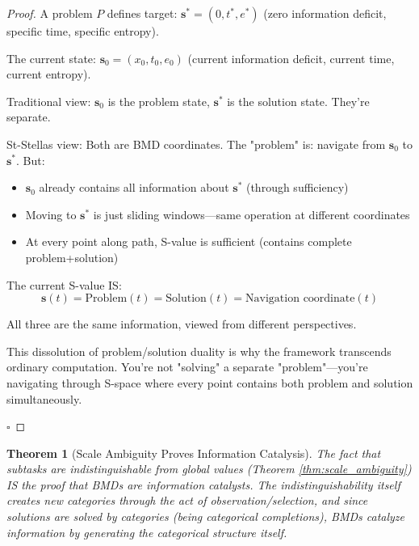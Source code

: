 \documentclass[12pt,a4paper]{article}
\newtheorem{theorem}{Theorem}[section]
\begin{document}
\begin{proof}
A problem $P$ defines target: $\mathbf{s}^* = (0, t^*, e^*)$ (zero information deficit, specific time, specific entropy).

The current state: $\mathbf{s}_0 = (x_0, t_0, e_0)$ (current information deficit, current time, current entropy).

Traditional view: $\mathbf{s}_0$ is the problem state, $\mathbf{s}^*$ is the solution state. They're separate.

St-Stellas view: Both are BMD coordinates. The "problem" is: navigate from $\mathbf{s}_0$ to $\mathbf{s}^*$. But:
\begin{itemize}
\item $\mathbf{s}_0$ already contains all information about $\mathbf{s}^*$ (through sufficiency)
\item Moving to $\mathbf{s}^*$ is just sliding windows—same operation at different coordinates
\item At every point along path, S-value is sufficient (contains complete problem+solution)
\end{itemize}

The current S-value IS:
\begin{equation}
\mathbf{s}(t) = \text{Problem}(t) = \text{Solution}(t) = \text{Navigation coordinate}(t)
\end{equation}

All three are the same information, viewed from different perspectives.

This dissolution of problem/solution duality is why the framework transcends ordinary computation. You're not "solving" a separate "problem"—you're navigating through S-space where every point contains both problem and solution simultaneously.

$\square$
\end{proof}

\begin{theorem}[Scale Ambiguity Proves Information Catalysis]
\label{thm:scale_ambiguity_proof}
The fact that subtasks are indistinguishable from global values (Theorem \ref{thm:scale_ambiguity}) IS the proof that BMDs are information catalysts. The indistinguishability itself \textit{creates new categories} through the act of observation/selection, and since solutions are solved by categories (being categorical completions), BMDs catalyze information by generating the categorical structure itself.
\end{theorem}
\end{document}
